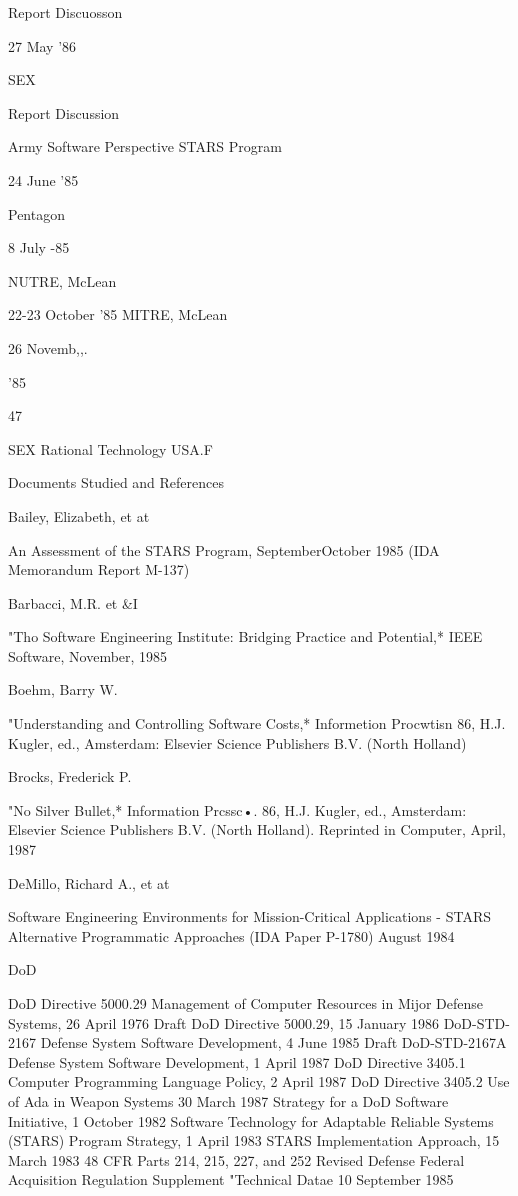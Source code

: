 \documentclass[12pt]{article}
\begin{document}
Report Discuosson

27 May '86

SEX

Report Discussion

Army Software Perspective
STARS Program

24 June '85

Pentagon

8 July -85

NUTRE, McLean

22-23 October '85 MITRE, McLean

26 Novemb,,.

'85

47

SEX
Rational Technology
USA.F


Documents Studied and References

Bailey, Elizabeth, et at

An Assessment of the STARS Program, SeptemberOctober 1985 (IDA Memorandum Report M-137)

Barbacci, M.R. et \&I

"Tho Software Engineering Institute: Bridging Practice
and Potential,* IEEE Software, November, 1985

Boehm, Barry W.

"Understanding and Controlling Software Costs,*
Informetion Procwtisn 86, H.J. Kugler, ed., Amsterdam:
Elsevier Science Publishers B.V. (North Holland)

Brocks, Frederick P.

"No Silver Bullet,* Information Prcssc•. 86,
H.J. Kugler, ed., Amsterdam: Elsevier Science Publishers B.V.
(North Holland). Reprinted in Computer, April, 1987

DeMillo, Richard A., et at

Software Engineering Environments for Mission-Critical
Applications - STARS Alternative Programmatic
Approaches
(IDA Paper P-1780) August 1984

DoD

DoD Directive 5000.29 Management of Computer Resources in
Mijor Defense Systems, 26 April 1976
Draft DoD Directive 5000.29, 15 January 1986
DoD-STD-2167 Defense System Software Development, 4 June 1985
Draft DoD-STD-2167A Defense System Software Development,
1 April 1987
DoD Directive 3405.1 Computer Programming Language Policy,
2 April 1987
DoD Directive 3405.2 Use of Ada in Weapon Systems 30 March 1987
Strategy for a DoD Software Initiative, 1 October 1982
Software Technology for Adaptable Reliable Systems (STARS)
Program Strategy, 1 April 1983
STARS Implementation Approach, 15 March 1983
48 CFR Parts 214, 215, 227, and 252 Revised Defense Federal
Acquisition Regulation Supplement "Technical Datae
10 September 1985
\end{document}

